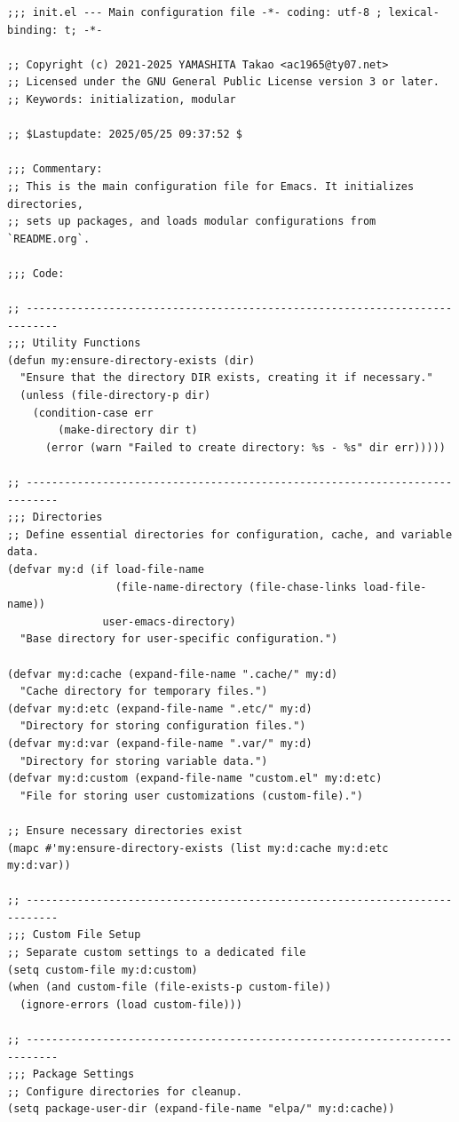 \documentclass[11pt]{article}
\begin{document}
\begin{verbatim}
;;; init.el --- Main configuration file -*- coding: utf-8 ; lexical-binding: t; -*-

;; Copyright (c) 2021-2025 YAMASHITA Takao <ac1965@ty07.net>
;; Licensed under the GNU General Public License version 3 or later.
;; Keywords: initialization, modular

;; $Lastupdate: 2025/05/25 09:37:52 $

;;; Commentary:
;; This is the main configuration file for Emacs. It initializes directories,
;; sets up packages, and loads modular configurations from `README.org`.

;;; Code:

;; ---------------------------------------------------------------------------
;;; Utility Functions
(defun my:ensure-directory-exists (dir)
  "Ensure that the directory DIR exists, creating it if necessary."
  (unless (file-directory-p dir)
    (condition-case err
        (make-directory dir t)
      (error (warn "Failed to create directory: %s - %s" dir err)))))

;; ---------------------------------------------------------------------------
;;; Directories
;; Define essential directories for configuration, cache, and variable data.
(defvar my:d (if load-file-name
                 (file-name-directory (file-chase-links load-file-name))
               user-emacs-directory)
  "Base directory for user-specific configuration.")

(defvar my:d:cache (expand-file-name ".cache/" my:d)
  "Cache directory for temporary files.")
(defvar my:d:etc (expand-file-name ".etc/" my:d)
  "Directory for storing configuration files.")
(defvar my:d:var (expand-file-name ".var/" my:d)
  "Directory for storing variable data.")
(defvar my:d:custom (expand-file-name "custom.el" my:d:etc)
  "File for storing user customizations (custom-file).")

;; Ensure necessary directories exist
(mapc #'my:ensure-directory-exists (list my:d:cache my:d:etc my:d:var))

;; ---------------------------------------------------------------------------
;;; Custom File Setup
;; Separate custom settings to a dedicated file
(setq custom-file my:d:custom)
(when (and custom-file (file-exists-p custom-file))
  (ignore-errors (load custom-file)))

;; ---------------------------------------------------------------------------
;;; Package Settings
;; Configure directories for cleanup.
(setq package-user-dir (expand-file-name "elpa/" my:d:cache))


\end{verbatim}
\end{document}
